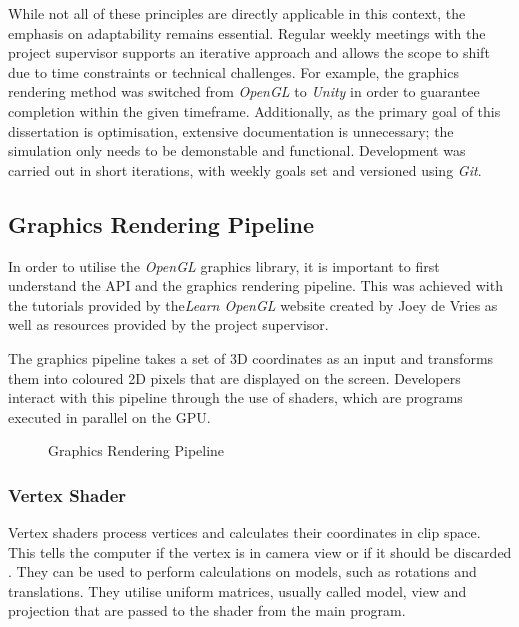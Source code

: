 \documentclass[12pt]{article}
\newcommand{\wideimage}[2][]{%
  \makebox[\textwidth][c]{\texttt{[image: \#2]}}%
}
\begin{document}
    While not all of these principles are directly applicable in this context, the emphasis on adaptability remains essential. Regular weekly meetings with the project supervisor supports an iterative approach and allows the scope to shift due to time constraints or technical challenges. For example, the graphics rendering method was switched from \textit{OpenGL} to \textit{Unity} in order to guarantee completion within the given timeframe. Additionally, as the primary goal of this dissertation is optimisation, extensive documentation is unnecessary; the simulation only needs to be demonstable and functional. Development was carried out in short iterations, with weekly goals set and versioned using \textit{Git}.

    \subsection{Graphics Rendering Pipeline}

    In order to utilise the \textit{OpenGL} graphics library\cite{opengl}, it is important to first understand the API and the graphics rendering pipeline. This was achieved with the tutorials provided by the\textit{Learn OpenGL} website created by Joey de Vries\cite{learnopengl} as well as resources provided by the project supervisor.

    The graphics pipeline takes a set of 3D coordinates as an input and transforms them into coloured 2D pixels that are displayed on the screen. Developers interact with this pipeline through the use of shaders, which are programs executed in parallel on the GPU.

    \begin{figure}[H]
        \wideimage[]{graphicsPipeline.png}
        \caption{Graphics Rendering Pipeline \cite{learnopengl}}
    \end{figure}

    \subsubsection{Vertex Shader}

    Vertex shaders process vertices and calculates their coordinates in clip space. This tells the computer if the vertex is in camera view or if it should be discarded \cite{shadertutorial}. They can be used to perform calculations on models, such as rotations and translations. They utilise uniform matrices, usually called model, view and projection that are passed to the shader from the main program.
\end{document}
